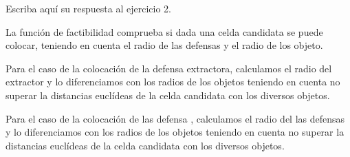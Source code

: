 Escriba aquí su respuesta al ejercicio 2.


La función de factibilidad comprueba si dada una celda candidata se puede colocar, teniendo en cuenta el radio de las defensas y el radio de los objeto.

Para el caso de la colocación de la defensa extractora, calculamos el radio del extractor y lo diferenciamos con los radios de los objetos teniendo en cuenta no superar la distancias euclídeas de la celda candidata con los diversos objetos.

Para el caso de la colocación de las defensa , calculamos el radio del las defensas y lo diferenciamos con los radios de los objetos teniendo en cuenta no superar la distancias euclídeas de la celda candidata con los diversos objetos. 


